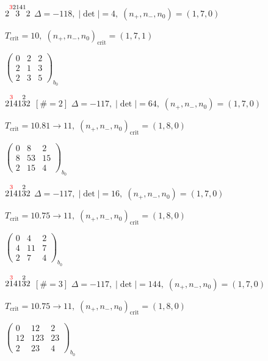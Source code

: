 \documentclass[10pt]{article}
\begin{document}
\smallskip

$2\overset{\textcolor{red}{3}2141}{3}2$ \quad $\Delta=-118,\; |\det|=4,\; (n_+,n_-,n_0)=(1,7,0)$

\hspace{1em}$T_{\text{crit}}=10,\; (n_+,n_-,n_0)_{\text{crit}}=(1,7,1)$

\hspace{2em}$\left(\begin{smallmatrix}0 & 2 & 2 \\ 2 & 1 & 3 \\ 2 & 3 & 5\end{smallmatrix}\right)_{\!b_0}$

$2\overset{\textcolor{red}{3}}{1}41\overset{2}{3}2$ $\scriptstyle [\#=2]$ \quad $\Delta=-117,\; |\det|=64,\; (n_+,n_-,n_0)=(1,7,0)$

\hspace{1em}$T_{\text{crit}}=10.81 \to 11,\; (n_+,n_-,n_0)_{\text{crit}}=(1,8,0)$

\hspace{2em}$\left(\begin{smallmatrix}0 & 8 & 2 \\ 8 & 53 & 15 \\ 2 & 15 & 4\end{smallmatrix}\right)_{\!b_0}$

$2\overset{\textcolor{red}{3}}{1}41\overset{2}{3}2$ \quad $\Delta=-117,\; |\det|=16,\; (n_+,n_-,n_0)=(1,7,0)$

\hspace{1em}$T_{\text{crit}}=10.75 \to 11,\; (n_+,n_-,n_0)_{\text{crit}}=(1,8,0)$

\hspace{2em}$\left(\begin{smallmatrix}0 & 4 & 2 \\ 4 & 11 & 7 \\ 2 & 7 & 4\end{smallmatrix}\right)_{\!b_0}$

$2\overset{\textcolor{red}{3}}{1}41\overset{2}{3}2$ $\scriptstyle [\#=3]$ \quad $\Delta=-117,\; |\det|=144,\; (n_+,n_-,n_0)=(1,7,0)$

\hspace{1em}$T_{\text{crit}}=10.75 \to 11,\; (n_+,n_-,n_0)_{\text{crit}}=(1,8,0)$

\hspace{2em}$\left(\begin{smallmatrix}0 & 12 & 2 \\ 12 & 123 & 23 \\ 2 & 23 & 4\end{smallmatrix}\right)_{\!b_0}$
\end{document}

